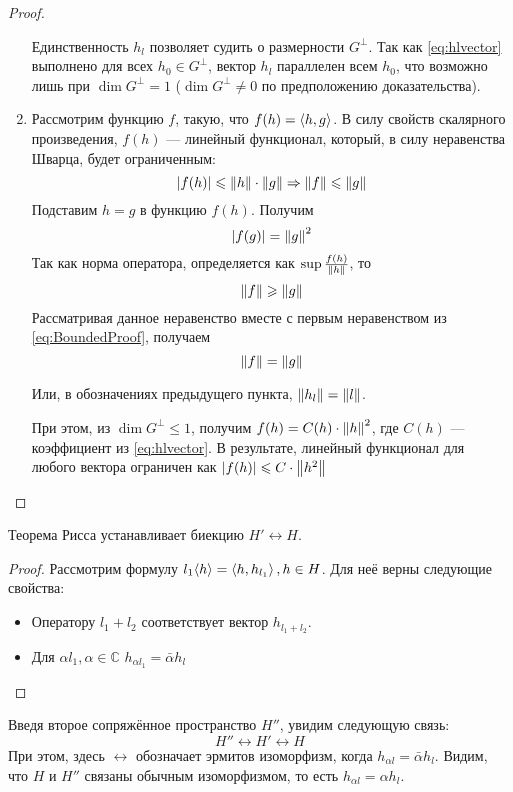 \documentclass[12pt]{article}
\begin{document}
\begin{proof}
\begin{enumerate}
			{\footnotesize
				Единственность $h_l$ позволяет судить о размерности $G^{\perp}$.
				Так как \eqref{eq:hlvector} выполнено для всех $h_0 \in G^{\perp}$, вектор $h_l$ параллелен всем $h_0$, 
				что возможно лишь при $\dim{G^{\perp}} = 1$ ($\dim{G^{\perp}} \neq 0$ по предположению доказательства).
			}
			
			\item Рассмотрим функцию $f$, такую, что $f(h) = \left\langle h, g \right\rangle$. В силу свойств скалярного произведения, 
			$f(h)$ --- линейный функционал, который, в силу неравенства Шварца, будет ограниченным:
			\begin{equation} \label{eq:BoundedProof}
				|f(h)| \leqslant \left\| h \right\| \cdot \left\| g \right\| \Rightarrow \left\| f \right\| \leqslant \left\| g \right\|
			\end{equation}
			Подставим $h = g$ в функцию $f(h)$. Получим
			$$|f(g)| = \left\| g \right\|^2$$
			Так как норма оператора, определяется как $\sup \frac{f(h)}{\left\| h \right\|}$, то 
			$$\left\| f \right\| \geqslant \left\| g \right\|$$
			Рассматривая данное неравенство вместе с первым неравенством из \eqref{eq:BoundedProof}, получаем 
			$$ \left\| f \right\| = \left\| g \right\| $$
			
			Или, в обозначениях предыдущего пункта, $\left\| h_l \right\| = \left\| l \right\|$.
			
			{\footnotesize
				При этом, из $\dim{G^{\perp}} \leq 1$, получим $f(h) = C(h) \cdot \left\| h \right\|^2$, где $C(h)$ --- коэффициент из 
				\eqref{eq:hlvector}. В результате, линейный функционал для любого вектора ограничен как 
				$|f(h)| \leqslant C \cdot \left\| h^2 \right\|$
			}
		\end{enumerate}
	\end{proof}
	
	\begin{note}
		Теорема Рисса устанавливает биекцию $H' \leftrightarrow H$.
	\end{note}
	\begin{proof}
		Рассмотрим формулу $l_1\langle h \rangle = \left\langle h, h_{l_1} \right\rangle, h \in H$. Для неё верны следующие
		свойства:
		\begin{itemize}
			\item Оператору $l_1 + l_2$ соответствует вектор $h_{l_1+l_2}$.
			\item Для $\alpha l_1, \alpha \in \mathbb{C}$ $h_{\alpha l_1} = \bar{\alpha} h_l$
		\end{itemize}
	\end{proof}
	
	Введя второе сопряжённое пространство $H''$, увидим следующую связь:
	$$H'' \leftrightarrow H' \leftrightarrow H$$
	При этом, здесь $\leftrightarrow$ обозначает эрмитов изоморфизм, когда 
	$h_{\alpha l} = \bar{\alpha} h_l$. %
	Видим, что $H$ и $H''$ связаны обычным изоморфизмом, то есть $h_{\alpha l} = \alpha h_l$.
	
\end{document}
